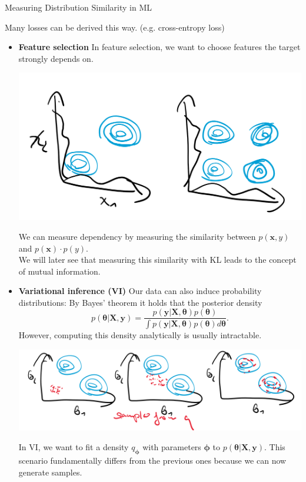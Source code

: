 \documentclass[11pt,compress,t,notes=noshow, xcolor=table]{beamer}
\begin{document}
\begin{vbframe} {Measuring Distribution Similarity in ML}
\begin{itemize}
Many losses can be derived this way. (e.g. cross-entropy loss)

\end{itemize}

\framebreak

\begin{itemize}
    \item \textbf{Feature selection}
In feature selection, we want to choose features the target strongly depends on. 

\includegraphics[width=0.6\linewidth]{slides/information-theory/figure_man/kl_ml_mi.png}

We can measure dependency by measuring the similarity between $p(\mathbf{x}, y)$ and $p(\mathbf{x})\cdot p(y).$ \\
We will later see that measuring this similarity with KL  leads to the concept of mutual information.

\end{itemize}

\framebreak

\begin{itemize}
    \item \textbf{Variational inference (VI)}
Our data can also induce probability distributions: By Bayes' theorem it holds that the posterior density $$p(\bm{\theta}\vert \mathbf{X}, \mathbf{y}) = \frac{p(\mathbf{y}|\mathbf{X}, \bm{\theta})p(\bm{\theta})}{\int p(\mathbf{y}|\mathbf{X}, \bm{\theta})p(\bm{\theta})d\bm{\theta}}.$$ However, computing this density analytically is usually intractable.

\includegraphics[width=0.99\linewidth]{slides/information-theory/figure_man/kl_ml_vi.png}

In VI, we want to fit a density $q_{\bm{\phi}}$ with parameters $\bm{\phi}$ to 
    $p(\bm{\theta}\vert \mathbf{X}, \mathbf{y}).$
This scenario fundamentally differs from the previous ones because we can now generate samples.

\end{itemize}

\end{vbframe}
\end{document}
